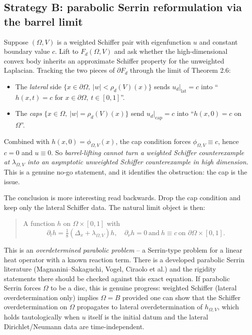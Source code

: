\documentclass[11pt]{article}
\newcommand{\Om}{\Omega}
\newcommand{\1}{\mathbf 1}
\newcommand{\nor}{\partial_\nu}
\begin{document}
\subsection*{Strategy B: parabolic Serrin reformulation via the barrel
limit}

Suppose $(\Om,V)$ is a weighted Schiffer pair with eigenfunction $u$ and
constant boundary value $c$. Lift to $F_d(\Om,V)$ and ask whether the
high-dimensional convex body inherits an approximate Schiffer property
for the unweighted Laplacian. Tracking the two pieces of $\partial F_d$
through the limit of Theorem 2.6:
\begin{itemize}[leftmargin=*]
    \item The \emph{lateral} side $\{x\in\partial\Om,\ |w|<\rho_d(V)(x)\}$
    sends $u_d|_{\text{lat}}=c$ into ``$h(x,t)=c$ for $x\in\partial\Om,\
    t\in[0,1]$''.
    \item The \emph{caps} $\{x\in\Om,\ |w|=\rho_d(V)(x)\}$ send
    $u_d|_{\text{cap}}=c$ into ``$h(x,0)=c$ on $\Om$''.
\end{itemize}
Combined with $h(x,0)=\phi_{\Om,V}(x)$, the cap condition forces
$\phi_{\Om,V}\equiv c$, hence $c=0$ and $u\equiv 0$. So
\emph{barrel-lifting cannot turn a weighted Schiffer counterexample at
$\lambda_{\Om,V}$ into an asymptotic unweighted Schiffer counterexample
in high dimension.} This is a genuine no-go statement, and it identifies
the obstruction: the cap is the issue.

The conclusion is more interesting read backwards. Drop the cap
condition and keep only the lateral Schiffer data. The natural limit
object is then:
\begin{quote}
A function $h$ on $\Om\times[0,1]$ with
\[
    \partial_t h=\tfrac{1}{8}(\Delta_x+\lambda_{\Om,V})h,\quad
    \nor h=0\ \text{and}\ h\equiv c\ \text{on }\partial\Om\times[0,1].
\]
\end{quote}
This is an \emph{overdetermined parabolic problem} -- a Serrin-type
problem for a linear heat operator with a known reaction term. There is
a developed parabolic Serrin literature (Magnanini--Sakaguchi,
Vogel, Ciraolo et al.) and the rigidity statements there should be
checked against this exact equation. If parabolic Serrin forces $\Om$
to be a disc, this is genuine progress: weighted Schiffer (lateral
overdetermination only) implies $\Om=B$ provided one can show that the
Schiffer overdetermination on $\Om$ propagates to lateral
overdetermination of $h_{\Om,V}$, which holds tautologically when $u$
itself is the initial datum and the lateral Dirichlet/Neumann data are
time-independent.
\end{document}
